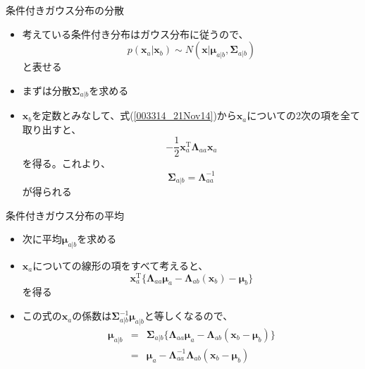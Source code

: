 \begin{frame}{条件付きガウス分布の分散}
 \begin{itemize}
  \item 考えている条件付き分布はガウス分布に従うので、
        \begin{equation}
         p(\bm{x}_a | \bm{x}_b) \sim N(\bm{x} | \bm{\mu}_{a|b}, \bm{\Sigma}_{a|b})
        \end{equation}
        と表せる
  \item まずは分散$\bm{\Sigma}_{a|b}$を求める
  \item $\bm{x}_b$を定数とみなして、式(\ref{003314_21Nov14})から$\bm{x}_a$についての2次の項を全て取り出すと、
        \begin{equation}
         -\frac{1}{2}\bm{x}_a^{\mathrm{T}}\bm{\Lambda}_{aa}\bm{x}_a
        \end{equation}
        を得る。これより、
        \begin{equation}
         \bm{\Sigma}_{a|b} = \bm{\Lambda}_{aa}^{-1}
        \end{equation}
        が得られる
 \end{itemize}
\end{frame}

\begin{frame}{条件付きガウス分布の平均}
 \begin{itemize}
  \item 次に平均$\bm{\mu}_{a|b}$を求める
  \item $\bm{x}_a$についての線形の項をすべて考えると、
        \begin{equation}
         \bm{x}_a^{\mathrm{T}}\{ \bm{\Lambda}_{aa}\bm{\mu}_a-\bm{\Lambda}_{ab}(\bm{x}_b)-\bm{\mu}_b\}
        \end{equation}
        を得る
  \item この式の$\bm{x}_a$の係数は$\bm{\Sigma}^{-1}_{a|b}\bm{\mu}_{a|b}$と等しくなるので、
        \begin{eqnarray}
         \bm{\mu}_{a|b} &=& \bm{\Sigma}_{a|b}\{\bm{\Lambda}_{aa}\bm{\mu}_a-\bm{\Lambda}_{ab}(\bm{x}_b-\bm{\mu}_b)\}\\
         &= & \bm{\mu}_a - \bm{\Lambda}_{aa}^{-1}\bm{\Lambda}_{ab}(\bm{x}_b-\bm{\mu}_b)
        \end{eqnarray}
 \end{itemize}
\end{frame}

